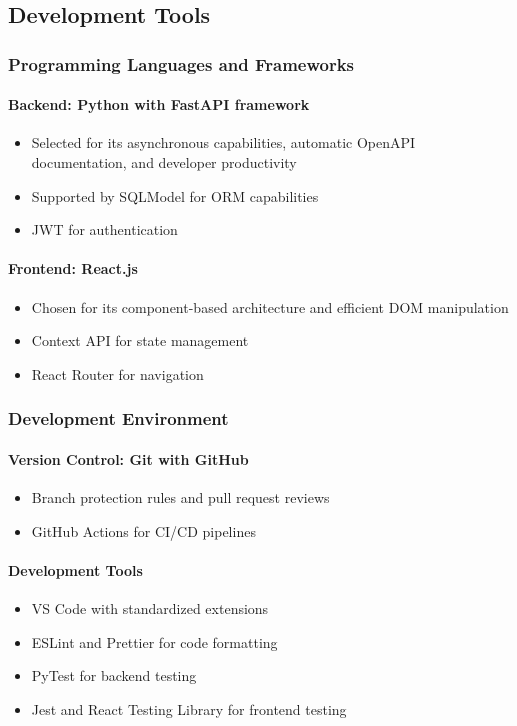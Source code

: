 \documentclass[12pt,a4paper]{article}
\begin{document}
\subsection{Development Tools}

\subsubsection{Programming Languages and Frameworks}

\paragraph{Backend: Python with FastAPI framework}
\begin{itemize}
    \item Selected for its asynchronous capabilities, automatic OpenAPI documentation, and developer productivity
    \item Supported by SQLModel for ORM capabilities
    \item JWT for authentication
\end{itemize}

\paragraph{Frontend: React.js}
\begin{itemize}
    \item Chosen for its component-based architecture and efficient DOM manipulation
    \item Context API for state management
    \item React Router for navigation
\end{itemize}

\subsubsection{Development Environment}

\paragraph{Version Control: Git with GitHub}
\begin{itemize}
    \item Branch protection rules and pull request reviews
    \item GitHub Actions for CI/CD pipelines
\end{itemize}

\paragraph{Development Tools}
\begin{itemize}
    \item VS Code with standardized extensions
    \item ESLint and Prettier for code formatting
    \item PyTest for backend testing
    \item Jest and React Testing Library for frontend testing
\end{itemize}
\end{document}
